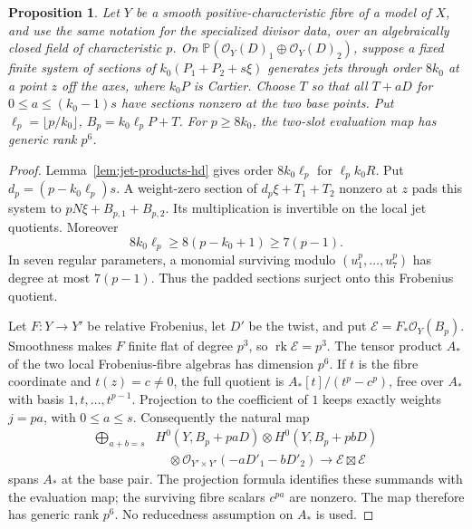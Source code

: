 \documentclass[12pt,a4paper,psamsfonts]{amsart}
\theoremstyle{definition}
\theoremstyle{plain}
\newtheorem{proposition}[lemma]{Proposition}
\newcommand{\OO}{\mathcal O}
\begin{document}
\begin{proposition}\label{prop:frob-rank-hd}
Let $Y$ be a smooth positive-characteristic fibre of a model of
$X$, and use the same notation for the specialized divisor data, over an algebraically closed field of characteristic $p$.
On $\mathbb P(\OO_Y(D)_1\oplus\OO_Y(D)_2)$, suppose a fixed
finite system of sections of $k_0(P_1+P_2+s\xi)$ generates jets
through order $8k_0$ at a point $z$ off the axes, where
$k_0P$ is Cartier. Choose $T$ so that all $T+aD$ for
$0\le a\le(k_0-1)s$ have sections nonzero at the two base points.
Put $\ell_p=\lfloor p/k_0\rfloor$, $B_p=k_0\ell_pP+T$.
For $p\ge8k_0$, the two-slot evaluation map has generic rank
$p^6$.
\end{proposition}
\begin{proof}
Lemma~\ref{lem:jet-products-hd} gives order
$8k_0\ell_p$ for $\ell_pk_0R$. Put $d_p=(p-k_0\ell_p)s$.
A weight-zero section of $d_p\xi+T_1+T_2$ nonzero at $z$ pads this
system to $pN\xi+B_{p,1}+B_{p,2}$. Its multiplication is invertible
on the local jet quotients. Moreover
\[
 8k_0\ell_p\ge8(p-k_0+1)\ge7(p-1).
\]
In seven regular parameters, a monomial surviving modulo
$(u_1^p,\ldots,u_7^p)$ has degree at most $7(p-1)$.
Thus the padded sections surject onto this Frobenius quotient.

Let $F:Y\to Y'$ be relative Frobenius, let $D'$ be the twist, and
put $\mathcal E=F_*\OO_Y(B_p)$. Smoothness makes $F$ finite flat
of degree $p^3$, so $\operatorname{rk}\mathcal E=p^3$.
The tensor product $A_*$ of the two local Frobenius-fibre algebras
has dimension $p^6$. If $t$ is the fibre coordinate and $t(z)=c\ne0$,
the full quotient is $A_*[t]/(t^p-c^p)$, free over $A_*$ with
basis $1,t,\ldots,t^{p-1}$. Projection to the coefficient of $1$
keeps exactly weights $j=pa$, with $0\le a\le s$.
Consequently the natural map
\[
 \begin{split}
 \bigoplus_{a+b=s}&H^0(Y,B_p+paD)\otimes H^0(Y,B_p+pbD)\\
 &\quad\otimes\OO_{Y'\times Y'}(-aD'_1-bD'_2)
 \longrightarrow\mathcal E\boxtimes\mathcal E
 \end{split}
\]
spans $A_*$ at the base pair. The projection formula identifies
these summands with the evaluation map; the surviving fibre scalars
$c^{pa}$ are nonzero. The map therefore has generic rank $p^6$.
No reducedness assumption on $A_*$ is used.
\end{proof}
\end{document}
